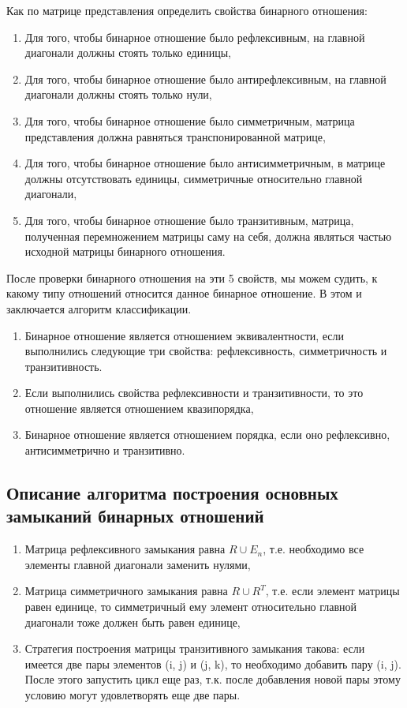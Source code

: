 \documentclass[bachelor, och, labwork]{shiza}
\begin{document}
		Как по матрице представления определить свойства бинарного отношения:
	\begin{enumerate}
		\item Для того, чтобы бинарное отношение было $\textit{рефлексивным}$, на главной  диагонали должны стоять только единицы,
		\item Для того, чтобы бинарное отношение было $\textit{антирефлексивным}$, на главной  диагонали должны стоять только нули,
		\item Для того, чтобы бинарное отношение было $\textit{симметричным}$, матрица представления должна равняться транспонированной матрице,
		\item Для того, чтобы бинарное отношение было $\textit{антисимметричным}$, в матрице должны отсутствовать единицы, симметричные относительно главной диагонали,
		\item Для того, чтобы бинарное отношение было $\textit{транзитивным}$, матрица, полученная перемножением матрицы саму на себя, должна являться частью исходной матрицы бинарного отношения.
	\end{enumerate}
	
	После проверки бинарного отношения на эти 5 свойств, мы можем судить,  к какому типу отношений относится данное бинарное отношение. В этом  и заключается алгоритм классификации.
	
	\begin{enumerate}
		\item Бинарное отношение является отношением эквивалентности, если выполнились следующие три свойства: рефлексивность, симметричность и транзитивность.
		\item Если выполнились свойства рефлексивности и транзитивности, то это отношение является отношением квазипорядка,
		\item Бинарное отношение является отношением порядка, если оно рефлексивно, антисимметрично и транзитивно.
	\end{enumerate}	
	
	\subsection{Описание алгоритма построения основных замыканий бинарных отношений}
	
	\begin{enumerate}
		\item Матрица $\textit{рефлексивного}$ замыкания равна $R \cup E_n$, т.е. необходимо все элементы главной диагонали заменить нулями,
		\item Матрица $\textit{симметричного}$ замыкания равна $R \cup R^T$, т.е. если элемент матрицы равен единице, то симметричный ему элемент относительно главной диагонали тоже должен быть равен единице,
		\item Стратегия построения матрицы $\textit{транзитивного}$ замыкания такова: если имеется две пары элементов (i, j) и (j, k), то необходимо добавить пару (i, j). После этого запустить цикл еще раз, т.к. после добавления новой пары этому условию могут удовлетворять еще две пары. 
		
	\end{enumerate}
	
\end{document}

